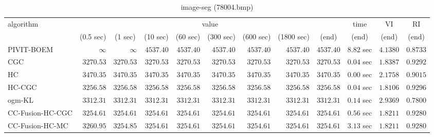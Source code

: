 \begin{table}[H]
\scriptsize
\centering
\caption{image-seg (78004.bmp)}
\label{tab:anytimetable-image-seg-78004.bmp}
\begin{tabular}{lrrrrrrrrrrr}
\toprule
           algorithm &                                   \multicolumn{8}{c}{value} & \multicolumn{1}{c}{time}    & \multicolumn{1}{c}{VI}  & \multicolumn{1}{c}{RI} \\  
\cmidrule(lr){2-9}\cmidrule(lr){10-10} \cmidrule(lr){11-11} \cmidrule(lr){12-12}   
                     & \multicolumn{1}{c}{(0.5 sec)} & \multicolumn{1}{c}{(1 sec)} & \multicolumn{1}{c}{(10 sec)} & \multicolumn{1}{c}{(60 sec)} & \multicolumn{1}{c}{(300 sec)} & \multicolumn{1}{c}{(600 sec)} & \multicolumn{1}{c}{(1800 sec)} & \multicolumn{1}{c}{(end)} & \multicolumn{1}{c}{(end)}    & \multicolumn{1}{c}{(end)}   & \multicolumn{1}{c}{(end)}  \\ \midrule 
          PIVIT-BOEM & $\infty$ & $\infty$ & $      4537.40$ & $      4537.40$ & $      4537.40$ & $      4537.40$ & $      4537.40$ & $      4537.40$ & $         8.82$ sec    & $       4.1380$  & $       0.8733$ \\ 
                 CGC & $      3270.53$ & $      3270.53$ & $      3270.53$ & $      3270.53$ & $      3270.53$ & $      3270.53$ & $      3270.53$ & $      3270.53$ & $         0.04$ sec    & $       1.8387$  & $       0.9292$ \\ 
                  HC & $      3470.35$ & $      3470.35$ & $      3470.35$ & $      3470.35$ & $      3470.35$ & $      3470.35$ & $      3470.35$ & $      3470.35$ & $         0.00$ sec    & $       2.1758$  & $       0.9015$ \\ 
              HC-CGC & $      3256.58$ & $      3256.58$ & $      3256.58$ & $      3256.58$ & $      3256.58$ & $      3256.58$ & $      3256.58$ & $      3256.58$ & $         0.04$ sec    & $       1.8106$  & $       0.9296$ \\ 
              ogm-KL & $      3312.31$ & $      3312.31$ & $      3312.31$ & $      3312.31$ & $      3312.31$ & $      3312.31$ & $      3312.31$ & $      3312.31$ & $         0.14$ sec    & $       2.9369$  & $       0.7800$ \\ 
    CC-Fusion-HC-CGC & $      3254.61$ & $      3254.61$ & $      3254.61$ & $      3254.61$ & $      3254.61$ & $      3254.61$ & $      3254.61$ & $      3254.61$ & $         0.56$ sec    & $       1.8211$  & $       0.9280$ \\ 
     CC-Fusion-HC-MC & $      3260.95$ & $      3254.85$ & $      3254.61$ & $      3254.61$ & $      3254.61$ & $      3254.61$ & $      3254.61$ & $      3254.61$ & $         3.13$ sec    & $       1.8211$  & $       0.9280$ \\ 

\end{tabular}
\end{table}
